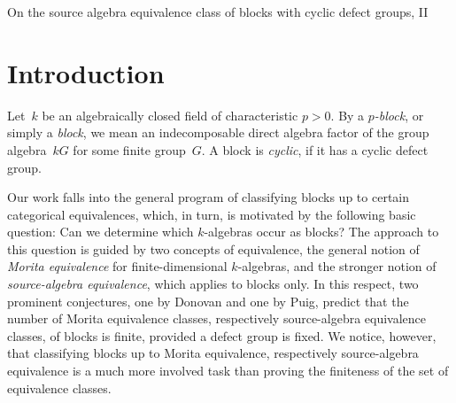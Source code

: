 \documentclass[12pt]{amsart}
\theoremstyle{theorem}
\theoremstyle{definition}
\theoremstyle{remark}
\begin{document}
\maketitle


\pagestyle{myheadings}
{On the source algebra equivalence class of blocks with cyclic defect groups, II}



\vspace{6mm}
\section{Introduction}

Let~$k$ be an algebraically closed field of characteristic $p > 0$. By a 
\emph{$p$-block}, or simply a \emph{block}, we mean an indecomposable direct 
algebra factor of the group algebra~$kG$ for some finite group~$G$. A block is 
\emph{cyclic}, if it has a cyclic defect group.

Our work falls into the general program of classifying blocks up to certain 
categorical equivalences, which, in turn, is motivated by the following basic 
question: Can we determine which $k$-algebras occur as blocks? The approach to 
this question is guided by two concepts of equivalence, the general notion of 
\emph{Morita equivalence} for finite-dimensional $k$-algebras, and the stronger 
notion of \emph{source-algebra equivalence}, which applies to blocks only. In 
this respect, two prominent conjectures, one by Donovan and one by Puig, predict 
that the number of Morita equivalence classes, respectively source-algebra 
equivalence classes, of blocks is finite, provided a defect group is fixed. We 
notice, however, that classifying blocks up to Morita equivalence, respectively 
source-algebra equivalence is a much more involved task than proving the 
finiteness of the set of equivalence classes.
\end{document}
